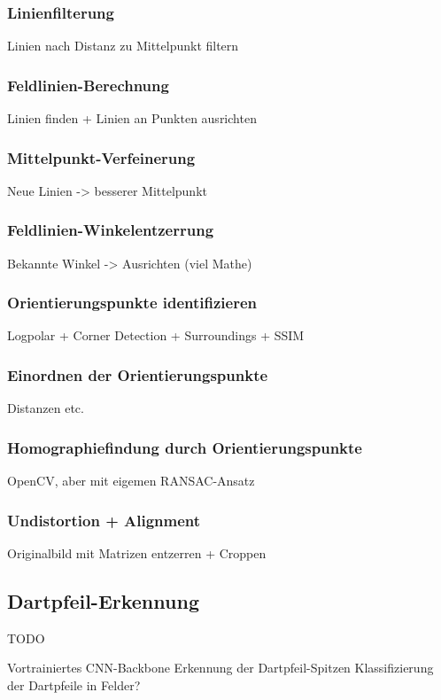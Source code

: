 \subsubsection{Linienfilterung}
Linien nach Distanz zu Mittelpunkt filtern

\subsubsection{Feldlinien-Berechnung}
Linien finden + Linien an Punkten ausrichten

\subsubsection{Mittelpunkt-Verfeinerung}
Neue Linien -> besserer Mittelpunkt

\subsubsection{Feldlinien-Winkelentzerrung}
Bekannte Winkel -> Ausrichten (viel Mathe)

\subsubsection{Orientierungspunkte identifizieren}
Logpolar + Corner Detection + Surroundings + SSIM

\subsubsection{Einordnen der Orientierungspunkte}
Distanzen etc.

\subsubsection{Homographiefindung durch Orientierungspunkte}
OpenCV, aber mit eigemen RANSAC-Ansatz

\subsubsection{Undistortion + Alignment}
Originalbild mit Matrizen entzerren + Croppen


\subsection{Dartpfeil-Erkennung}

TODO

Vortrainiertes CNN-Backbone
Erkennung der Dartpfeil-Spitzen
Klassifizierung der Dartpfeile in Felder?
